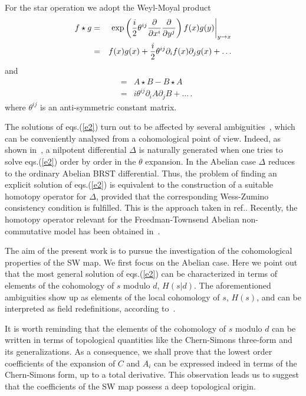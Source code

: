 \documentclass[a4paper,12pt]{article}
\newcommand{\starcomm}[2]{[ #1 \, ,^{\!\!\star} #2 ]}
\begin{document}
For the star operation  we adopt the Weyl-Moyal product 
%
\begin{eqnarray}
f \star g & = &
\left . \exp \left( {i \over 2} \theta^{ij} {\partial \over \partial x^i}
{\partial \over \partial y^j} \right) f(x) g(y) \right |_{y \rightarrow x} 
\nonumber \\
& = & f(x)g(x) +  {i \over 2} \theta^{ij} \partial_i f(x) \partial_j g(x)
 + \dots  
\label{e3}
\end{eqnarray}
%
and 
%
\begin{eqnarray}
\starcomm{A}{B} &=& A \star B - B \star A \nonumber\\
		&=& i \theta^{ij} \partial_i A \partial_j B + \dots \, .
\label{e3.bis}
\end{eqnarray}
%
where $\theta^{ij}$ is an anti-symmetric constant matrix.

The solutions of eqs.(\ref{e2}) turn out to be affected by several
 ambiguities~\cite{Asakawa:1999cu,Jurco:2001rq,Brace:2001fj}, which can be
 conveniently analysed from a cohomological point of view.  Indeed, as shown
 in~\cite{Brace:2001fj}, a  nilpotent differential $\Delta$ is naturally
 generated when one tries to solve eqs.(\ref{e2}) order by order in the
 $\theta$ expansion.
In the Abelian case $\Delta$ reduces to the ordinary Abelian BRST differential.
Thus, the problem of finding an explicit solution of eqs.(\ref{e2}) is
 equivalent to the  construction of  a suitable homotopy operator for $\Delta$,
 provided that the corresponding Wess-Zumino consistency condition is
 fulfilled.
This is the approach taken in ref.\cite{Brace:2001fj}.
Recently, the homotopy operator relevant for the Freedman-Townsend Abelian
 non-commutative model has been obtained in~\cite{Barnich:2001mc}. 

The aim of the present work is to pursue the investigation of the cohomological
 properties of the SW map. We first focus on the Abelian case.
 Here we point out that the most general solution of eqs.(\ref{e2}) can be
 characterized in terms of elements of the cohomology of $s$ modulo $d$,
 $H(s|d)$. The aforementioned ambiguities show up as elements of the local
 cohomology of $s$, $H(s)$, and can be interpreted as field
 redefinitions, according to~\cite{Asakawa:1999cu,Jurco:2001rq,Brace:2001fj}.

It is worth reminding that the elements of the cohomology of $s$ modulo $d$
 can be written in terms of topological quantities like the Chern-Simons
 three-form and its generalizations.
As a consequence, we shall prove that the lowest order coefficients of the
 expansion of $C$ and $A_i$ can be  expressed indeed in terms of the
 Chern-Simons form, up to a total derivative.
This observation leads us to suggest  that the coefficients of
 the SW map possess a deep topological origin. 
  
\end{document}

